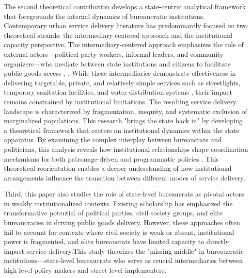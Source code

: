 \vspace{3mm}
The second theoretical contribution develops a state-centric analytical framework that foregrounds the internal dynamics of bureaucratic institutions. Contemporary urban service delivery literature has predominantly focused on two theoretical strands: the intermediary-centered approach and the institutional capacity perspective. The intermediary-centered approach emphasizes the role of external actors—political party workers, informal leaders, and community organizers—who mediate between state institutions and citizens to facilitate public goods access \citep{auerbach_clients_2019}, \citep{krishna_politics_2007}. While these intermediaries demonstrate effectiveness in delivering targetable, private, and relatively simple services such as streetlights, temporary sanitation facilities, and water distribution systems \citep{pande_can_2011}, their impact remains constrained by institutional limitations. The resulting service delivery landscape is characterized by fragmentation, inequity, and systematic exclusion of marginalized populations.
This research "brings the state back in" by developing a theoretical framework that centers on institutional dynamics within the state apparatus. By examining the complex interplay between bureaucrats and politicians, this analysis reveals how institutional relationships shape coordination mechanisms for both patronage-driven and programmatic policies \citep{evans_bringing_1985}. This theoretical reorientation enables a deeper understanding of how institutional arrangements influence the transition between different modes of service delivery.

\vspace{3mm}
Third, this paper also studies the role of state-level bureaucrats as pivotal actors in weakly institutionalized contexts. Existing scholarship has emphasized the transformative potential of political parties, civil society groups, and elite bureaucracies in driving public goods delivery. However, these approaches often fail to account for contexts where civil society is weak or absent, institutional power is fragmented, and elite bureaucrats have limited capacity to directly impact service delivery.This study theorizes the "missing middle" in bureaucratic institutions—state-level bureaucrats who serve as crucial intermediaries between high-level policy makers and street-level implementers. 

